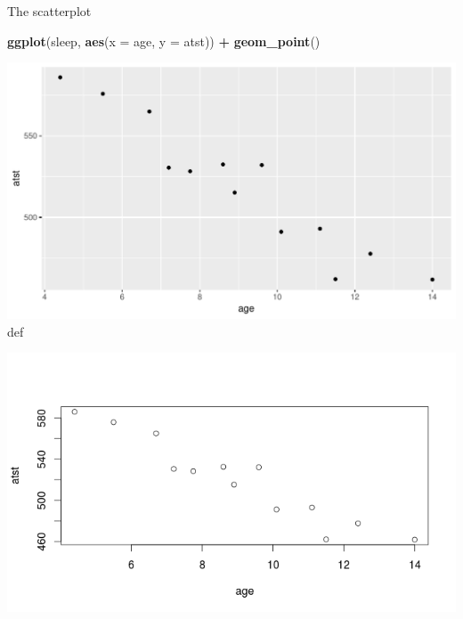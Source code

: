\documentclass[ignorenonframetext,]{beamer}
\newenvironment{Shaded}{\begin{snugshade}}{\end{snugshade}}
\newcommand{\DataTypeTok}[1]{\textcolor[rgb]{0.13,0.29,0.53}{#1}}
\newcommand{\KeywordTok}[1]{\textcolor[rgb]{0.13,0.29,0.53}{\textbf{#1}}}
\newcommand{\NormalTok}[1]{#1}
\newcommand{\OperatorTok}[1]{\textcolor[rgb]{0.81,0.36,0.00}{\textbf{#1}}}
\newcommand{\StringTok}[1]{\textcolor[rgb]{0.31,0.60,0.02}{#1}}
\begin{document}
\begin{frame}[fragile]{The scatterplot}
\protect\hypertarget{the-scatterplot}{}

\begin{Shaded}
\begin{Highlighting}[]
\KeywordTok{ggplot}\NormalTok{(sleep, }\KeywordTok{aes}\NormalTok{(}\DataTypeTok{x =}\NormalTok{ age, }\DataTypeTok{y =}\NormalTok{ atst)) }\OperatorTok{+}\StringTok{ }\KeywordTok{geom_point}\NormalTok{()}
\end{Highlighting}
\end{Shaded}

\includegraphics{figure/suggo-1.pdf} def

\includegraphics{sleep-times.png}

\end{frame}
\end{document}
